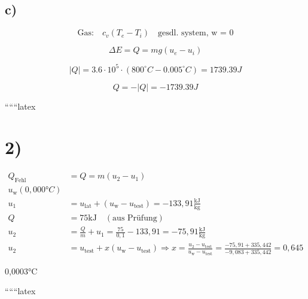 

\subsection*{c)}

\[
\text{Gas:} \quad c_v(T_e - T_i) \quad \text{gesdl. system, w = 0}
\]

\[
\Delta E = Q = m g (u_e - u_i)
\]

\[
|Q| = 3.6 \cdot 10^5 \cdot (800^\circ C - 0.005^\circ C) = 1739.39 J
\]

\[
Q = -|Q| = -1739.39 J
\]

``````latex


\section*{2)}

\begin{align*}
Q_{\text{Fehl}} &= Q = m (u_2 - u_1) \\
u_{\text{w}}(0,000°C) \\
u_1 &= u_{\text{lat}} + (u_{\text{w}} - u_{\text{test}}) = -133,91 \frac{\text{kJ}}{\text{kg}} \\
Q &= 75 \text{kJ} \quad (\text{aus Prüfung}) \\
u_2 &= \frac{Q}{m} + u_1 = \frac{75}{0,1} - 133,91 = -75,91 \frac{\text{kJ}}{\text{kg}} \\
u_2 &= u_{\text{test}} + x (u_{\text{w}} - u_{\text{test}}) \Rightarrow x = \frac{u_2 - u_{\text{test}}}{u_{\text{w}} - u_{\text{test}}} = \frac{-75,91 + 335,442}{-9,083 + 335,442} = 0,645
\end{align*}

0,0003°C

``````latex
